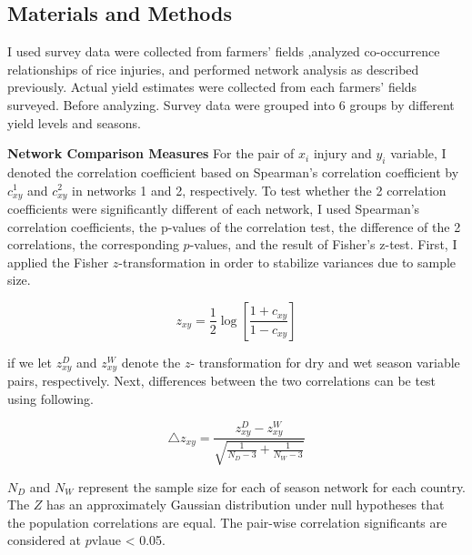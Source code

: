 \subsection{Materials and Methods}
I used survey data were collected from farmers' fields ,analyzed co-occurrence relationships of rice injuries, and performed network analysis as described previously. Actual yield estimates were collected from each farmers' fields surveyed. Before analyzing. Survey data were grouped into 6 groups by different yield levels and seasons.  

\textbf{Network Comparison Measures}
For the pair of $x_{i}$ injury and $y_{i}$ variable, I denoted the correlation coefficient based on Spearman's correlation coefficient by $c_{xy}^1$ and $c_{xy}^2$ in networks 1 and 2, respectively. To test whether the 2 correlation coefficients were significantly different of each network, I used Spearman's correlation coefficients, the p-values of the correlation test, the difference of the 2 correlations, the corresponding $p$-values, and the result of Fisher's z-test. First, I applied the Fisher $z$-transformation in order to stabilize variances due to sample size.

\begin{equation}
z_{xy} = \frac{1}{2} \log\left[{\frac{1 + c_{xy}}{1 - c_{xy}}}\right]
\end{equation}

if we let $z_{xy}^D $ and $z_{xy}^W$ denote the $z$- transformation for dry and wet season variable pairs, respectively. 
Next, differences between the two correlations can be test using following. 

\begin{equation}
\triangle z_{xy} = \frac{z_{xy}^D - z_{xy}^W}{\sqrt{\frac{1}{N_{D}-3}+ \frac{1}{N_{W}-3}}}
\end{equation}

$N_{D}$ and $N_{W}$ represent the sample size for each of season network for each country. The $Z$ has an approximately Gaussian distribution under null hypotheses that the population correlations are equal. The pair-wise correlation significants are considered at $p$vlaue < 0.05.


 

